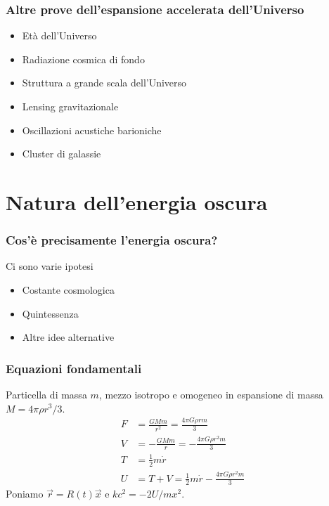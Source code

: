 \begin{frame}
  \frametitle{Altre prove dell'espansione accelerata dell'Universo}
  \begin{itemize}
  \item Età dell'Universo
  \item Radiazione cosmica di fondo
  \item Struttura a grande scala dell'Universo
  \item Lensing gravitazionale
  \item Oscillazioni acustiche barioniche
  \item Cluster di galassie
  \end{itemize}
\end{frame}

\section[Natura]{Natura dell'energia oscura}

\begin{frame}
  \frametitle{Cos'è precisamente l'energia oscura?}
  Ci sono varie ipotesi
  \begin{itemize}
  \item Costante cosmologica
  \item Quintessenza
  \item Altre idee alternative
  \end{itemize}
\end{frame}

\begin{frame}
  \frametitle[]{Equazioni fondamentali}
  Particella di massa $m$, mezzo \alert{isotropo e omogeneo} in espansione di
  massa $M = 4\pi\rho r^3/3$.
  \begin{align*}
    F &= \frac{GMm}{r^2} = \frac{4\pi G \rho r m}{3} \\
    V &= -\frac{GMm}{r} = -\frac{4\pi G \rho r^2 m}{3} \\
    T &= \frac{1}{2}m\dot{r} \\
    U &= T + V = \frac{1}{2}m\dot{r} - \frac{4\pi G \rho r^2 m}{3}
  \end{align*}
  Poniamo $\vec{r} = R(t)\vec{x}$ e $kc^2 = -2U/mx^2$.
\end{frame}

